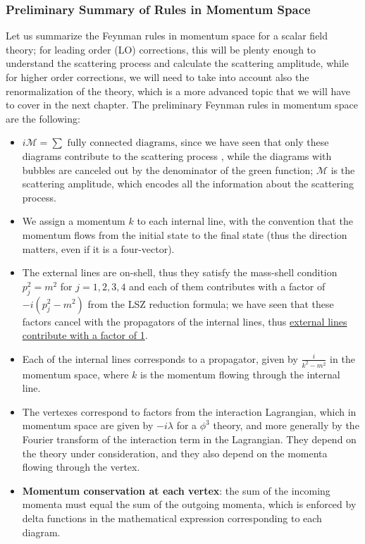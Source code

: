 \subsubsection{Preliminary Summary of Rules in Momentum Space}

Let us summarize the Feynman rules in momentum space for a scalar field theory; for leading order (LO) corrections, this will be plenty enough to understand the scattering process and calculate the scattering amplitude, while for higher order corrections, we will need to take into account also the renormalization of the theory, which is a more advanced topic that we will have to cover in the next chapter. The preliminary Feynman rules in momentum space are the following:
\begin{itemize}
    \item \(i \mathcal{M} = \sum \text{ fully connected diagrams} \), since we have seen that only these diagrams contribute to the scattering process , while the diagrams with bubbles are canceled out by the denominator of the green function; \(\mathcal{M}\) is the scattering amplitude, which encodes all the information about the scattering process.
    \item We assign a momentum \(k\) to each internal line, with the convention that the momentum flows from the initial state to the final state (thus the direction matters, even if it is a four-vector).
    \item The external lines are on-shell, thus they satisfy the mass-shell condition \(p_j^2 = m^2\) for \(j=1,2,3,4\) and each of them contributes with a factor of \(-i(p_j^2 - m^2)\) from the LSZ reduction formula; we have seen that these factors cancel with the propagators of the internal lines, thus \uline{external lines contribute with a factor of 1}.
    \item Each of the internal lines corresponds to a propagator, given by \(\frac{i}{k^2 - m^2}\) in the momentum space, where \(k\) is the momentum flowing through the internal line.
    \item The vertexes correspond to factors from the interaction Lagrangian, which in momentum space are given by \(-i \lambda\) for a \(\phi^3\) theory, and more generally by the Fourier transform of the interaction term in the Lagrangian. They depend on the theory under consideration, and they also depend on the momenta flowing through the vertex.
    \item \textbf{Momentum conservation at each vertex}: the sum of the incoming momenta must equal the sum of the outgoing momenta, which is enforced by delta functions in the mathematical expression corresponding to each diagram.

\end{itemize}
